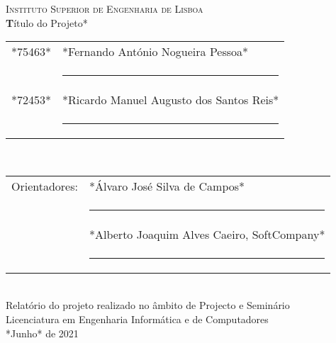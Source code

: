 \begin{center}
    \textsc{\LARGE Instituto Superior de Engenharia de Lisboa}\\[50mm]

    {\large \textbf  *T\'{i}tulo do Projeto*}\\[20mm]

    \begin{tabular}{rl}
        *75463* & *Fernando António Nogueira Pessoa*\\[10mm]
        & \rule{75mm}{0.5pt}\\[5mm]
        *72453* & *Ricardo Manuel Augusto dos Santos Reis*\\[10mm]
        & \rule{75mm}{0.5pt}                       \\
    \end{tabular}\\[10mm]

    \begin{tabular}{rl}
        Orientadores: & *Álvaro José Silva de Campos*\\[10mm]
        & \rule{75mm}{0.5pt}\\[5mm]
        & *Alberto Joaquim Alves Caeiro, SoftCompany*\\[10mm]
        & \rule{75mm}{0.5pt}                          \\
    \end{tabular}\\[10mm]

    Relatório do projeto realizado no âmbito de Projecto e Seminário\\
    Licenciatura em Engenharia Informática e de Computadores\\[20mm]
    *Junho* de 2021\\
\end{center}
